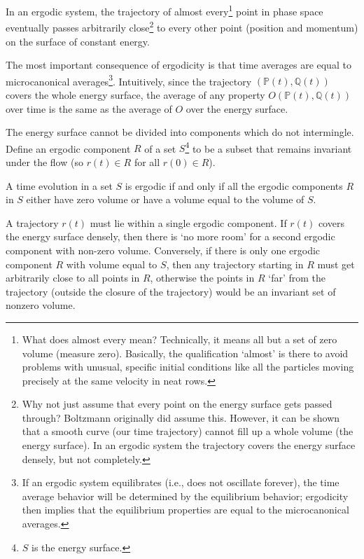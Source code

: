 \documentclass[12pt,a4paper]{article}
\begin{document}
\begin{tcolorbox}[colback=green!5,colframe=green!40!black,title= Definition 1]
In an ergodic system, the trajectory of almost every\footnote{What does almost every mean? Technically, it means all but a set of zero volume (measure zero). Basically, the qualification `almost' is there to avoid problems with unusual, specific initial conditions like all the particles moving precisely at the same velocity in neat rows.} point in phase space eventually passes arbitrarily close\footnote{Why not just assume that every point on the energy surface gets passed through? Boltzmann originally did assume this. However, it can be shown that a smooth curve (our time trajectory) cannot fill up a whole volume (the energy surface). In an ergodic system the trajectory covers the energy surface densely, but not completely.} to every other point (position and momentum) on the surface of constant energy.
\end{tcolorbox}

The most important consequence of ergodicity is that time averages are equal to microcanonical averages\footnote{If an ergodic system equilibrates (i.e., does not oscillate forever), the time average behavior will be determined by the equilibrium behavior; ergodicity then implies that the equilibrium properties are equal to the microcanonical averages.}. Intuitively, since the trajectory $(\mathbb P(t), \mathbb Q(t))$ covers the whole energy surface, the average of any property $O(\mathbb P(t), \mathbb Q(t))$ over time is the same as the average of $O$ over the energy surface. 

The energy surface cannot be divided into components which do not intermingle. Define an ergodic component $R$ of a set $S$\footnote{$S$ is the energy surface.} to be a subset that remains invariant under the flow (so $r(t) \in R$ for all $r(0) \in R$).

\begin{tcolorbox}[colback=green!5,colframe=green!40!black,title= Definition 2]
A time evolution in a set $S$ is ergodic if and only if all the ergodic components $R$ in $S$ either have zero volume or have a volume equal to the volume of $S$.
\end{tcolorbox}
A trajectory $r(t)$ must lie within a single ergodic component. If $r(t)$ covers the energy surface densely, then there is ‘no more room’ for a second ergodic component with non-zero volume. Conversely, if there is only one ergodic component $R$ with volume equal to $S$, then any trajectory starting in $R$ must get arbitrarily close to all points in $R$, otherwise the points in $R$ `far' from the trajectory (outside the closure of the trajectory) would be an invariant set of nonzero volume.
\end{document}
